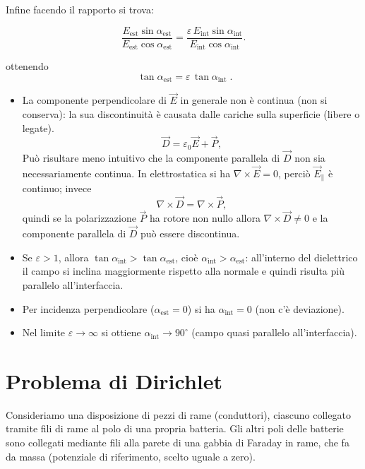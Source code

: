 \documentclass{book}
\begin{document}
Infine facendo il rapporto si trova:

\[
\frac{E_{\mathrm{est}}\sin\alpha_{\mathrm{est}}}{E_{\mathrm{est}}\cos\alpha_{\mathrm{est}}}
= \frac{\varepsilon\,E_{\mathrm{int}}\sin\alpha_{\mathrm{int}}}{E_{\mathrm{int}}\cos\alpha_{\mathrm{int}}}.
\]

ottenendo
\[
\boxed{\;\tan\alpha_{\mathrm{est}}=\varepsilon\,\tan\alpha_{\mathrm{int}}\; }.
\]


\begin{itemize}
\item{La componente perpendicolare di \(\vec{E}\)  in generale non è continua (non si conserva): la sua discontinuità è causata dalle cariche sulla superficie (libere o legate). 
\[
\vec{D}=\varepsilon_0\vec{E}+\vec{P},
\]
Può risultare meno intuitivo che la componente parallela di \(\vec{D}\) non sia necessariamente continua. In elettrostatica si ha \(\nabla\times\vec{E}=0\), perciò \(\vec{E}_{\parallel}\) è continuo; invece
\[
\nabla\times\vec{D}=\nabla\times\vec{P},
\]
quindi se la polarizzazione \(\vec{P}\) ha rotore non nullo allora \(\nabla\times\vec{D}\neq 0\) e la componente parallela di \(\vec{D}\) può essere discontinua.}

  \item Se $\varepsilon>1$, allora $\tan\alpha_{\text{int}}>\tan\alpha_{\text{est}}$, cioè $\alpha_{\text{int}}>\alpha_{\text{est}}$: all'interno del dielettrico il campo si inclina maggiormente rispetto alla normale e quindi risulta più parallelo all'interfaccia.
  \item Per incidenza perpendicolare ($\alpha_{\text{est}}=0$) si ha $\alpha_{\text{int}}=0$ (non c'è deviazione).
  \item Nel limite $\varepsilon\to\infty$ si ottiene $\alpha_{\text{int}}\to 90^\circ$ (campo quasi parallelo all'interfaccia).
\end{itemize}


\section{Problema di Dirichlet}

Consideriamo una disposizione di pezzi di rame (conduttori), ciascuno collegato tramite fili di rame al polo di una propria batteria. Gli altri poli delle batterie sono collegati mediante fili alla parete di una gabbia di Faraday in rame, che fa da massa (potenziale di riferimento, scelto uguale a zero).
\end{document}
